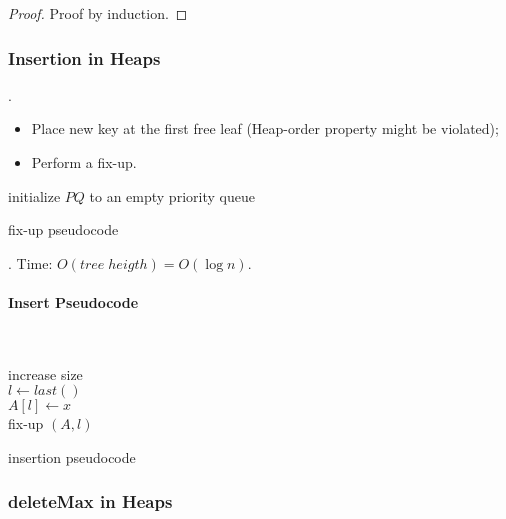 \documentclass{article}
\begin{document}
\begin{proof}
    Proof by induction. 
\end{proof}

\begin{center}
\end{center}

\subsubsection{Insertion in Heaps}

\begin{algo}[].
    \begin{itemize}
        \item Place new key at the first free leaf (Heap-order property might be violated); 
        \item Perform a fix-up. 
    \end{itemize}
\end{algo}

\begin{algorithm}[H] 
    initialize $PQ$ to an empty priority queue \;
    \caption{fix-up pseudocode}
\end{algorithm}

\begin{discovery}[].
    Time: $O(tree \; heigth) = O(\log{n})$. 
\end{discovery}

\paragraph{Insert Pseudocode} \phantom{text}\\
\begin{algorithm}[H] 
    increase size \\  
    $l \leftarrow last()$ \\
    $A[l] \leftarrow x$ \\
    fix-up $(A, l)$ 
    \caption{insertion pseudocode}
\end{algorithm}

\subsubsection{deleteMax in Heaps}
\end{document}
